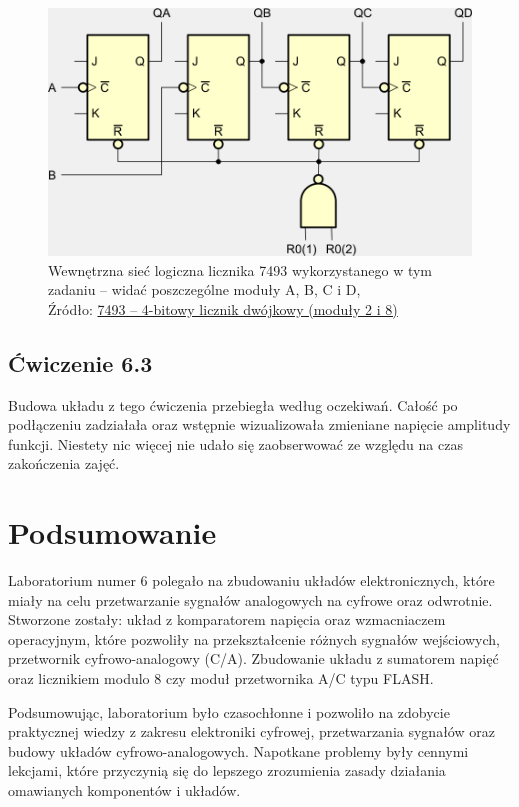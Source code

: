 \documentclass{article}
\begin{document}
      \begin{figure}[!ht]
        \centering
        \includegraphics[scale=0.5]{grafiki/7493_01.png}
          \caption{Wewnętrzna sieć logiczna licznika 7493 wykorzystanego w tym zadaniu -- widać poszczególne moduły A, B, C i D,
          \\Źródło: \href{https://eduinf.waw.pl/inf/prg/010_uc/7493.php}{7493 – 4-bitowy licznik dwójkowy (moduły 2 i 8)}}
      \end{figure}

    \subsection{Ćwiczenie 6.3}
      Budowa układu z tego ćwiczenia przebiegła według oczekiwań. Całość po podłączeniu zadziałała oraz wstępnie wizualizowała zmieniane napięcie amplitudy funkcji. Niestety nic więcej nie udało się zaobserwować ze względu na czas zakończenia zajęć.

  \section{Podsumowanie}
    Laboratorium numer 6 polegało na zbudowaniu układów elektronicznych, które miały na celu przetwarzanie sygnałów analogowych na cyfrowe oraz odwrotnie. Stworzone zostały: układ z komparatorem napięcia oraz wzmacniaczem operacyjnym, które pozwoliły na przekształcenie różnych sygnałów wejściowych,   
    przetwornik cyfrowo-analogowy (C/A). Zbudowanie układu z sumatorem napięć oraz licznikiem modulo 8 czy moduł przetwornika A/C typu FLASH.

    Podsumowując, laboratorium było czasochłonne i pozwoliło na zdobycie praktycznej wiedzy z zakresu elektroniki cyfrowej, przetwarzania sygnałów oraz budowy układów cyfrowo-analogowych. Napotkane problemy były cennymi lekcjami, które przyczynią się do lepszego zrozumienia zasady działania omawianych komponentów i układów.
    
\end{document}
